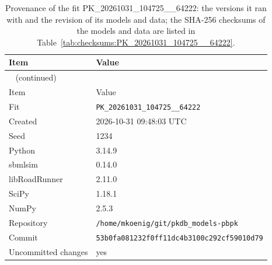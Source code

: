 \begin{longtable}{ll}
\caption{Provenance of the fit PK\_20261031\_104725\_\_64222: the versions it ran with and the revision of its models and data; the SHA-256 checksums of the models and data are listed in Table~\ref{tab:checksums:PK_20261031_104725__64222}.}\label{tab:provenance:PK_20261031_104725__64222} \\
\toprule
Item & Value \\
\midrule
\endfirsthead
\multicolumn{2}{l}{\small\tablename~\thetable{} (continued)} \\
\toprule
Item & Value \\
\midrule
\endhead
\bottomrule
\endlastfoot
Fit & \texttt{PK\_20261031\_104725\_\_64222} \\
Created & 2026-10-31 09:48:03 UTC \\
Seed & 1234 \\
Python & 3.14.9 \\
sbmlsim & 0.14.0 \\
libRoadRunner & 2.11.0 \\
SciPy & 1.18.1 \\
NumPy & 2.5.3 \\
Repository & \texttt{/home/mkoenig/git/pkdb\_models-pbpk} \\
Commit & \texttt{53b0fa081232f0ff11dc4b3100c292cf59010d79} \\
Uncommitted changes & yes \\
\end{longtable}



